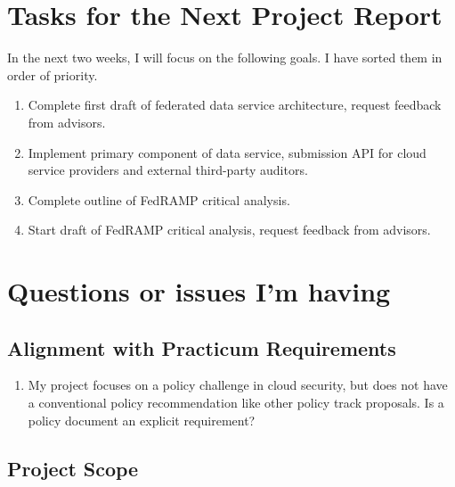 \documentclass{jdf}
\begin{document}
\section*{Tasks for the Next Project Report}

In the next two weeks, I will focus on the following goals. I have sorted them in order of priority.

\begin{enumerate}
    \item Complete first draft of federated data service architecture, request feedback from advisors.
    \item Implement primary component of data service, submission API for cloud service providers and external third-party auditors.
    \item Complete outline of FedRAMP critical analysis.
    \item Start draft of FedRAMP critical analysis, request feedback from advisors.
\end{enumerate}

\section*{Questions or issues I'm having}

\subsection*{Alignment with Practicum Requirements}

\begin{enumerate}
    \item My project focuses on a policy challenge in cloud security, but does not have a conventional policy recommendation like other policy track proposals. Is a policy document an explicit requirement?
\end{enumerate}

\subsection*{Project Scope}
\end{document}
